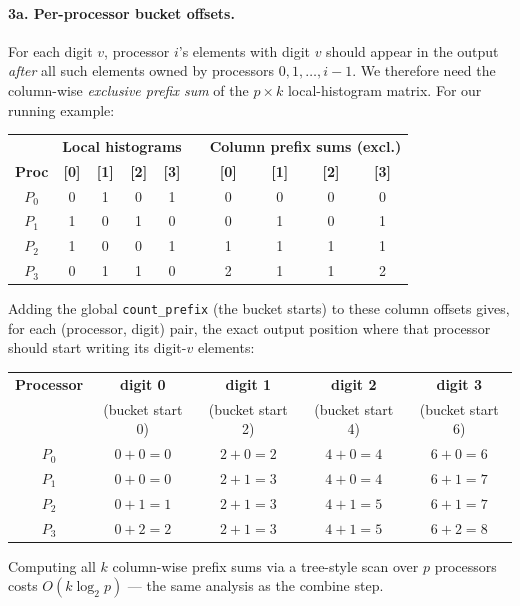 \paragraph{3a. Per-processor bucket offsets.}
For each digit $v$, processor $i$'s elements with digit $v$ should
appear in the output \emph{after} all such elements owned by processors
$0,1,\ldots,i-1$. We therefore need the column-wise \emph{exclusive
prefix sum} of the $p \times k$ local-histogram matrix. For our running
example:
\begin{center}
\begin{tabular}{c|cccc|c|cccc}
\toprule
& \multicolumn{4}{c|}{\textbf{Local histograms}}
& & \multicolumn{4}{c}{\textbf{Column prefix sums (excl.)}} \\
\textbf{Proc} & \textbf{[0]} & \textbf{[1]} & \textbf{[2]} & \textbf{[3]}
& & \textbf{[0]} & \textbf{[1]} & \textbf{[2]} & \textbf{[3]} \\
\midrule
$P_0$ & 0 & 1 & 0 & 1 & & 0 & 0 & 0 & 0 \\
$P_1$ & 1 & 0 & 1 & 0 & & 0 & 1 & 0 & 1 \\
$P_2$ & 1 & 0 & 0 & 1 & & 1 & 1 & 1 & 1 \\
$P_3$ & 0 & 1 & 1 & 0 & & 2 & 1 & 1 & 2 \\
\bottomrule
\end{tabular}
\end{center}
Adding the global \texttt{count\_prefix} (the bucket starts) to these
column offsets gives, for each (processor, digit) pair, the exact output
position where that processor should start writing its digit-$v$
elements:
\begin{center}
\begin{tabular}{c|cccc}
\toprule
\textbf{Processor} & \textbf{digit 0} & \textbf{digit 1} & \textbf{digit 2} & \textbf{digit 3} \\
& (bucket start 0) & (bucket start 2) & (bucket start 4) & (bucket start 6) \\
\midrule
$P_0$ & $0+0 = 0$ & $2+0 = 2$ & $4+0 = 4$ & $6+0 = 6$ \\
$P_1$ & $0+0 = 0$ & $2+1 = 3$ & $4+0 = 4$ & $6+1 = 7$ \\
$P_2$ & $0+1 = 1$ & $2+1 = 3$ & $4+1 = 5$ & $6+1 = 7$ \\
$P_3$ & $0+2 = 2$ & $2+1 = 3$ & $4+1 = 5$ & $6+2 = 8$ \\
\bottomrule
\end{tabular}
\end{center}
Computing all $k$ column-wise prefix sums via a tree-style scan over
$p$ processors costs $O(k \log_2 p)$ --- the same analysis as the
combine step.

